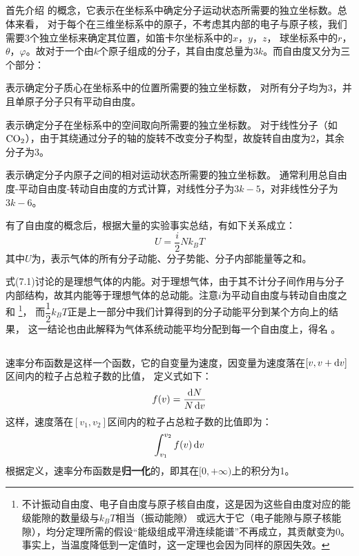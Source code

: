 \subsection[能量均分原理]{}
首先介绍 的概念，它表示在坐标系中确定分子运动状态所需要的独立坐标数。总体来看，
对于每个在三维坐标系中的原子，不考虑其内部的电子与原子核，我们需要3个独立坐标来确定其位置，如笛卡尔坐标系中的$x$，$y$，$z$，
球坐标系中的$r$，$\theta$，$\varphi$。故对于一个由$k$个原子组成的分子，其自由度总量为$3k$。而自由度又分为三个部分：
\begin{Itemize}
    \item {} 表示确定分子质心在坐标系中的位置所需要的独立坐标数，
    对所有分子均为3，并且单原子分子只有平动自由度。
    \item {} 表示确定分子在坐标系中的空间取向所需要的独立坐标数。
    对于线性分子（如$\rm{CO_{2}}$），由于其绕通过分子的轴的旋转不改变分子构型，故旋转自由度为2，其余分子为3。
    \item {} 表示确定分子内原子之间的相对运动状态所需要的独立坐标数。
    通常利用总自由度-平动自由度-转动自由度的方式计算，对线性分子为$3k-5$，对非线性分子为$3k-6$。
\end{Itemize}

有了自由度的概念后，根据大量的实验事实总结，有如下关系成立：
\begin{equation}
    U = \frac{i}{2}Nk_{B}T
\end{equation}
其中$U$为，表示气体的所有分子动能、分子势能、分子内部能量等之和。

式(7.1)讨论的是理想气体的内能。对于理想气体，由于其不计分子间作用与分子内部结构，故其内能等于理想气体的总动能。注意$i$为平动自由度与转动自由度之和
\footnote{不计振动自由度、电子自由度与原子核自由度，这是因为这些自由度对应的能级能隙的数量级与$k_{B}T$相当（振动能隙）
    或远大于它（电子能隙与原子核能隙），均分定理所需的假设“能级组成平滑连续能谱”不再成立，其贡献变为$0$。
    事实上，当温度降低到一定值时，这一定理也会因为同样的原因失效。}，
而$\dfrac{1}{2}k_{B}T$正是上一部分中我们计算得到的分子动能平分到某个方向上的结果，
这一结论也由此解释为气体系统动能平均分配到每一个自由度上，得名 。
\subsection[麦克斯韦分布]{}
速率分布函数是这样一个函数，它的自变量为速度，因变量为速度落在$[v,v+\dif{v}]$区间内的粒子占总粒子数的比值，
定义式如下：
\begin{equation}
    f(v) = \frac{\dif{N}}{N\dif{v}}
    \nonumber
\end{equation}
这样，速度落在$[v_{1},v_{2}]$区间内的粒子占总粒子数的比值即为：
\begin{equation}
    \int_{v_{1}}^{v_{2}} f(v)\dif{v}
    \nonumber
\end{equation}
根据定义，速率分布函数是\textbf{归一化}的，即其在$[0,+\infty)$上的积分为1。

